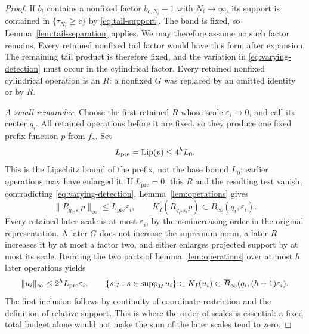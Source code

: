 \begin{proof}
If \(b_i\) contains a nonfixed factor \(b_{c,N_i}-1\) with
\(N_i\to\infty\), its support is contained in
\(\{\tau_{N_i}\geq c\}\) by \eqref{eq:tail-support}.
The band is fixed, so Lemma~\ref{lem:tail-separation} applies.
We may therefore assume no such factor remains. Every retained
nonfixed tail factor would have this form after expansion. The remaining
tail product is therefore fixed, and the variation in
\eqref{eq:varying-detection} must occur in the cylindrical factor.
Every retained nonfixed cylindrical operation is an \(R\): a
nonfixed \(G\) was replaced by an omitted identity or by \(R\).

\emph{A small remainder.}
Choose the first retained \(R\) whose scale
\(\varepsilon_i\to0\), and call its center \(q_i\).
All retained operations before it are fixed, so they produce one
fixed prefix function \(p\) from \(f_\gamma\). Set
\[
                 L_{\mathrm{pre}}=\operatorname{Lip}(p)\leq4^hL_0.
\]
This is the Lipschitz bound of the prefix, not the base bound \(L_0\);
earlier operations may have enlarged it. If \(L_{\mathrm{pre}}=0\),
this \(R\) and the resulting test vanish, contradicting \eqref{eq:varying-detection}.
Lemma~\ref{lem:operations} gives
\[
 \|R_{q_i,\varepsilon_i}p\|_\infty
       \leq L_{\mathrm{pre}}\varepsilon_i,\qquad
 K_I(R_{q_i,\varepsilon_i}p)
       \subset\overline B_\infty(q_i,\varepsilon_i).
\]
Every retained later scale is at most \(\varepsilon_i\), by the
nonincreasing order in the original representation. A later \(G\)
does not increase the supremum norm, a later \(R\) increases it
by at most a factor two, and either enlarges projected support by
at most its scale. Iterating the two parts of
Lemma~\ref{lem:operations} over at most \(h\) later operations yields
\begin{equation}
 \|u_i\|_\infty\leq2^hL_{\mathrm{pre}}\varepsilon_i,\qquad
 \{s|_I:s\in\operatorname{supp}_B u_i\}
    \subset K_I(u_i)
    \subset\overline B_\infty(q_i,(h+1)\varepsilon_i).       \label{eq:small-r-support}
\end{equation}
The first inclusion follows by continuity of coordinate restriction
and the definition of relative support. This is where the order of
scales is essential: a fixed total budget alone would not make the
sum of the later scales tend to zero.


\end{proof}
